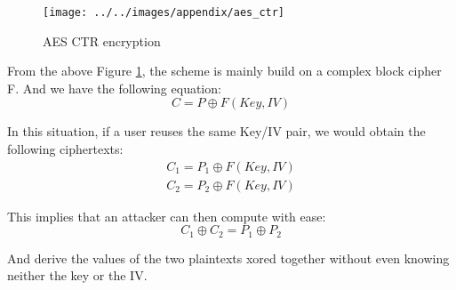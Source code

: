 \documentclass[../main.tex]{subfiles}
\begin{document}
\begin{figure}[bh]
    \centering
    \texttt{[image: ../../images/appendix/aes\_ctr]}
    
    \caption{AES CTR encryption}
    \label{appendix:figure:aes_ctr}
\end{figure}

\par From the above Figure \ref{appendix:figure:aes_ctr}, the scheme is mainly build on a complex block cipher F. And we have the following equation:
\begin{equation}
    C = P \oplus F(Key, IV)
\end{equation}
\par In this situation, if a user reuses the same Key/IV pair, we would obtain the following ciphertexts:
\begin{equation}
    \begin{split}
        C_1 = P_1 \oplus F(Key, IV)\\
        C_2 = P_2 \oplus F(Key, IV)
    \end{split}
\end{equation}
\par This implies that an attacker can then compute with ease:
\begin{equation}
    C_1 \oplus C_2 = P_1 \oplus P_2
\end{equation}
\par And derive the values of the two plaintexts xored together without even knowing neither the key or the IV.
\end{document}
